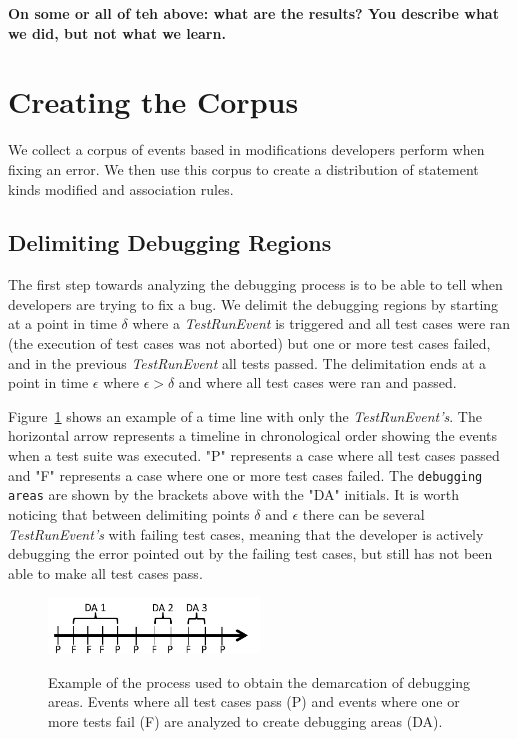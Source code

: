 \documentclass[sigconf]{acmart}
\newcommand{\todo}[1]
  {{\scriptsize \textbf{\color{red} {#1}}}}
\begin{document}
\todo{On some or all of teh above: what are the results?  You describe what we
  did, but not what we learn.}

\section{Creating the Corpus}
We collect a corpus of events based in modifications 
developers perform when fixing an error. We then
use this corpus to create a distribution of statement
kinds modified and association rules.

\subsection{Delimiting Debugging Regions}
\label{delimitDebugRegions}


The first step towards analyzing the debugging
process is to be able to tell when
developers are trying to fix a bug.
We delimit the debugging regions by starting at a point
in time $\delta$ where a \textit{TestRunEvent} is triggered and 
all test cases were ran (the execution of test cases
was not aborted) but one or more test cases failed, and in the 
previous \textit{TestRunEvent} all tests passed.
The delimitation ends at a point in time $\epsilon $ where $ \epsilon > \delta$ 
and where all test cases were ran and passed.

Figure~\ref{demarcations} shows an example of a time line
with only the \textit{TestRunEvent's}. The 
horizontal arrow represents a timeline in chronological order showing
the events when a test suite was executed. "P" represents a case
where all test cases passed and "F" represents a case where one
or more test cases failed. The \texttt{debugging areas} are shown by
the brackets above with the "DA" initials. 
It is worth noticing
that between delimiting points $\delta$ and $\epsilon$ there can be 
several \textit{TestRunEvent's} with failing test cases, meaning
that the developer is actively debugging the error pointed out
by the failing test cases, but still has not been able to make
all test cases pass.

\begin{figure}[h]
\caption{Example of the process used to obtain the demarcation of
debugging areas. Events where all test cases pass (P) and
events where one or more tests fail (F) are analyzed to create
debugging areas (DA).}
\centering
\includegraphics[width=0.5\textwidth]{images/demarcations.png}
\label{demarcations}
\end{figure}
\end{document}
